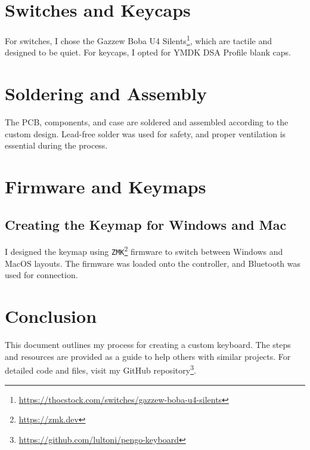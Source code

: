 \documentclass[a4paper,12pt]{article}
\begin{document}
\section{Switches and Keycaps}
For switches, I chose the Gazzew Boba U4 Silents\footnote{\url{https://thocstock.com/switches/gazzew-boba-u4-silents}}, which are tactile and designed to be quiet. For keycaps, I opted for YMDK DSA Profile blank caps.

\section{Soldering and Assembly}
The PCB, components, and case are soldered and assembled according to the custom design. Lead-free solder was used for safety, and proper ventilation is essential during the process.

\section{Firmware and Keymaps}
\subsection{Creating the Keymap for Windows and Mac}
I designed the keymap using \texttt{ZMK}\footnote{\url{https://zmk.dev}} firmware to switch between Windows and MacOS layouts. The firmware was loaded onto the controller, and Bluetooth was used for connection.

\section{Conclusion}
This document outlines my process for creating a custom keyboard. The steps and resources are provided as a guide to help others with similar projects. For detailed code and files, visit my GitHub repository\footnote{\url{https://github.com/lultoni/pengo-keyboard}}.
\end{document}
